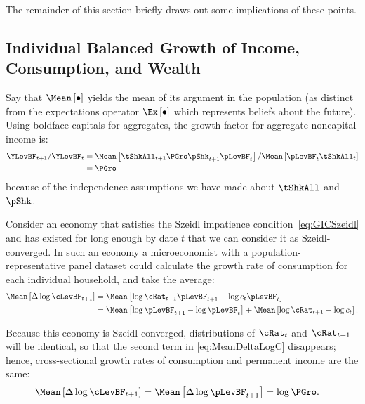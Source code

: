 \documentclass[BufferStockTheory]{subfiles}
\begin{document}
The remainder of this section briefly draws out some implications of these points.

\hypertarget{Growth-Rates-of-Individual-Income-and-Consumption}{}
\subsection{Individual Balanced Growth of  Income, Consumption, and Wealth}\label{subsec:cGroEqPGroQ}

Say that $\Mean\left[\bullet\right]$ yields the mean of its argument in the population (as distinct from the expectations operator $\Ex\left[\bullet\right]$ which represents beliefs about the future).  Using boldface capitals for aggregates, the growth factor for aggregate noncapital income is:
\begin{align*}
  \YLevBF_{t+1}/\YLevBF_{t}  & = \Mean\left[\tShkAll_{t+1}\PGro \pShk_{t+1}\pLevBF_{t}\right]/\Mean\left[\pLevBF_{t}\tShkAll_{t}\right]  \\
                             & = \PGro
\end{align*}
because of the independence assumptions we have made about $\tShkAll$ and $\pShk$.

Consider an economy that satisfies the Szeidl impatience condition~\eqref{eq:GICSzeidl} and has existed for long enough by date $t$ that we can consider it as Szeidl-converged.  In such an economy a microeconomist with a population-representative panel dataset could calculate the growth rate of consumption for each individual household, and take the average:
\begin{equation}\label{eq:MeanDeltaLogC}
  \begin{split}
    \Mean\left[\Delta \log \cLevBF_{t+1}\right]  & = \Mean\left[ \log {\cRat}_{t+1}\pLevBF_{t+1} - \log c_{t}\pLevBF_{t}\right]  \\
    & = \Mean\left[ \log \pLevBF_{t+1}- \log \pLevBF_{t}\right] + \Mean\left[ \log {\cRat}_{t+1} - \log c_{t}\right].
  \end{split}
\end{equation}

Because this economy is Szeidl-converged, distributions of $\cRat_{t}$ and $\cRat_{t+1}$ will be identical, so that the second term in  \eqref{eq:MeanDeltaLogC} disappears; hence, cross-sectional growth rates of consumption and permanent income are the same:
\begin{align}
  \Mean\left[\Delta \log \cLevBF_{t+1}\right]  & = \Mean\left[ \Delta \log \pLevBF_{t+1}\right] = \log \PGro \label{eq:MeanDeltaLogCeqMeanDeltaLogP}.
\end{align}
\end{document}
